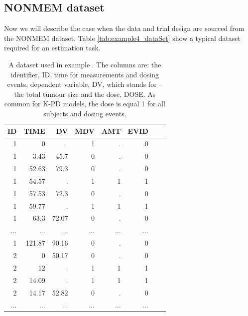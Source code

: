 \subsection{NONMEM dataset}
\label{sec:eg5-NONMEMdataset}
Now we will describe the case when the data and trial design are sourced from the 
NONMEM dataset. Table \ref{tab:example4_dataSet} show a typical dataset required for 
an estimation task.
\begin{table}[htdp]
\begin{center}
\small
\renewcommand{\arraystretch}{1.1}%
\begin{tabular}{rrrrrrrr}\toprule
ID	& TIME	& DV		& MDV	& AMT	& EVID \\ \midrule
1	& 0		& .		&  1		& .		& 0 \\
1	& 3.43	& 45.7	&  0		& .		& 0 \\
1	& 52.63	& 79.3	&  0		& .		& 0 \\
1	& 54.57	& .		&  1		& 1		& 1 \\
1	& 57.53	& 72.3	&  0		& .		& 0 \\
1	& 59.77	& .		&  1		& 1		& 1 \\
1	& 63.3	& 72.07	&  0		& .		& 0 \\
...	& ...		& ...		& ...		& ...		& ...  \\
1	& 121.87	& 90.16	&  0		& .		& 0 \\
2	& 0		& 50.17	&  0		& .		& 0 \\
2	& 12		& .		&  1		& 1		& 1 \\
2	& 14.09	& .		&  1		& 1		& 1 \\
2	& 14.17	& 52.82	&  0		& .		& 0 \\
...	& ...		& ...		& ...		& ...		& ... \\ \bottomrule
\end{tabular}
\end{center}
\caption{A dataset used in example \theexamples.
The columns are: the identifier, ID, time for measurements and dosing events, 
dependent variable, DV, which stands for  -- the total tumour size and 
the dose, DOSE. As common for K-PD models, the dose is equal 1 for all subjects and 
dosing events. }
\label{tab:example5_dataSet}
\end{table}%


